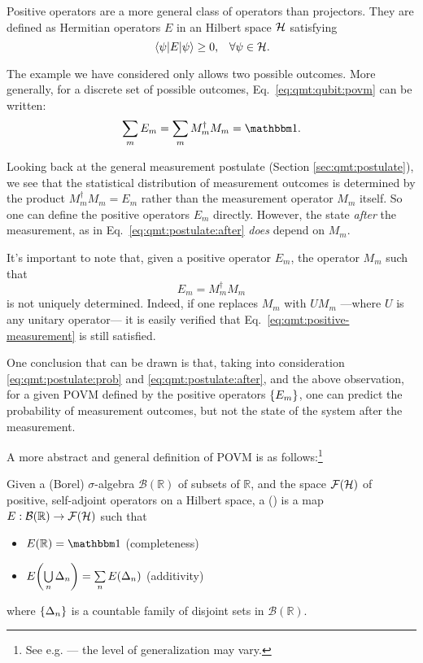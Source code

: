 Positive operators are a more general class of operators than projectors.
They are defined as Hermitian operators $E$ in an Hilbert space $\mathcal{H}$ satisfying
\[
  \ev{E}{\psi} \ge 0 \text{,}\quad \forall \psi \in \hilb{H}.
\]

The example we have considered only allows two possible outcomes.
More generally, for a discrete set of possible outcomes, 
Eq.~\eqref{eq:qmt:qubit:povm} can be written:
\begin{equation}
  \sum_m E_m = \sum_m M_m^{\dagger} M_m = \idop \text{.}
\end{equation}

Looking back at the general measurement postulate (Section \ref{sec:qmt:postulate}),
we see that the statistical distribution of measurement outcomes
is determined by the product $M_m^{\dagger} M_m = E_m$ rather than the
measurement operator $M_m$ itself. So one can define the positive operators $E_m$ directly.
However, the state \emph{after} the measurement, as in Eq.~\eqref{eq:qmt:postulate:after}
\emph{does} depend on $M_m$.

It's important to note that, given a positive operator $E_m$, the operator
$M_m$ such that
\begin{equation}\label{eq:qmt:positive-measurement}
  E_m = M_{m}^{\dagger} M_m
\end{equation}
is not uniquely determined. 
Indeed, if one replaces $M_m$ with $UM_m$
---where $U$ is any unitary operator---
it is easily verified that
Eq.~\eqref{eq:qmt:positive-measurement} is still satisfied.

One conclusion that can be drawn is that,
taking into consideration \eqref{eq:qmt:postulate:prob} and
\eqref{eq:qmt:postulate:after}, and the above observation,
for a  given POVM defined by the positive operators $\left\{E_m\right\}$,
one can predict the probability of measurement outcomes,
but not the state of the system after the measurement.

A more abstract and general definition of POVM is as
follows:\footnote{
  See e.g. \cite{BeneduciPhD, Berberian} --- the level of generalization may vary.
}
\begin{definition}
  Given a (Borel) $\sigma$-algebra $\mathcal{B}(\mathbb{R})$ of subsets of $\mathbb{R}$,
  and the space $\mathcal{F}(\mathcal{H})$ of positive, self-adjoint operators on a Hilbert space,
  a  ()
  is a map $E: \mathcal{B}(\mathbb{R}) \rightarrow \mathcal{F}(\mathcal{H})$
  such that
  \begin{itemize}
    \item $E(\mathbb{R}) = \idop$ (completeness)
    \item $E\qty(\bigcup\limits_{n} \Delta_n) = \sum\limits_{n} E\qty(\Delta_n)$ (additivity) 
  \end{itemize}
  where $\left\{\Delta_n\right\}$ is a countable family of disjoint sets in
  $\mathcal{B}(\mathbb{R})$.
\end{definition}
